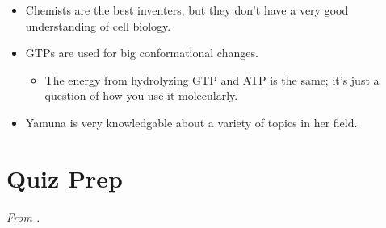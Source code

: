 \documentclass[../notes.tex]{subfiles}
\begin{document}
\begin{itemize}
\begin{itemize}
    \end{itemize}
    \item Chemists are the best inventers, but they don't have a very good understanding of cell biology.
    \item GTPs are used for big conformational changes.
    \begin{itemize}
        \item The energy from hydrolyzing GTP and ATP is the same; it's just a question of how you use it molecularly.
    \end{itemize}
    \item Yamuna is very knowledgable about a variety of topics in her field.
\end{itemize}



\section{Quiz Prep}
\emph{From \textcite{bib:QuizReading}.}
\end{document}
